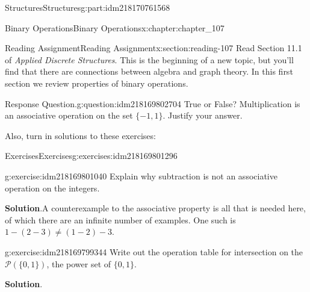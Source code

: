 \documentclass[oneside,10pt,]{book}
\newcommand{\blocktitlefont}{\relax}
\numberwithin{equation}{section}
\begin{document}
\begin{partptx}{Structures}{}{Structures}{}{}{g:part:idm218170761568}
\begin{chapterptx}{Binary Operations}{}{Binary Operations}{}{}{x:chapter:chapter_107}
\index{}%
%
%
\typeout{************************************************}
\typeout{************************************************}
%
\begin{sectionptx}{Reading Assignment}{}{Reading Assignment}{}{}{x:section:reading-107}
Read Section 11.1 of \emph{Applied Discrete Structures}. This is the beginning of a new topic, but you'll find that there are connections between algebra and graph theory.   In this first section we review properties of binary operations.%
\begin{question}{Response Question.}{g:question:idm218169802704}%
True or False?  Multiplication is an associative operation on the set \(\{-1,1\}\).  Justify your answer.%
\end{question}
Also, turn in solutions to these exercises:%
%
%
\typeout{************************************************}
\typeout{************************************************}
%
\begin{exercises-subsection-numberless}{Exercises}{}{Exercises}{}{}{g:exercises:idm218169801296}
\par\medskip\noindent%
%
\begin{exercisegroup}
\begin{divisionexerciseeg}{1}{}{}{g:exercise:idm218169801040}%
Explain why subtraction is not an associative operation on the integers.%
\par\smallskip%
\noindent\textbf{\blocktitlefont Solution}.\hypertarget{g:solution:idm218169800432}{}\quad{}A counterexample to the associative property is all that is needed here, of which there are an infinite number of examples.  One such is \(1-(2-3)\neq (1-2)-3\).%
\end{divisionexerciseeg}%
\begin{divisionexerciseeg}{2}{}{}{g:exercise:idm218169799344}%
Write out the operation table for intersection on the \(\mathcal{P}(\{0,1\})\), the power set of \(\{0,1\}\).%
\par\smallskip%
\noindent\textbf{\blocktitlefont Solution}.\hypertarget{g:solution:idm218169797952}{}\quad{}%
\end{divisionexerciseeg}%
\end{exercisegroup}
\par\medskip\noindent
\end{exercises-subsection-numberless}
\end{sectionptx}
%
%
\typeout{************************************************}

\end{chapterptx}
\end{partptx}
\end{document}
